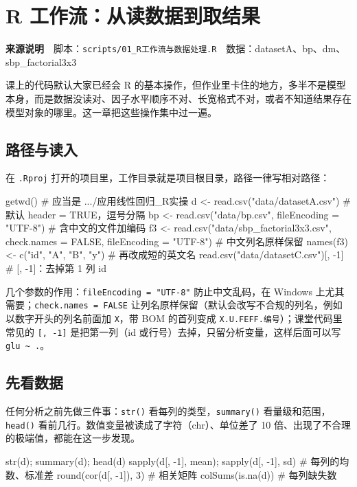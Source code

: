 \chapter{R 工作流：从读数据到取结果}

\begin{studysource}
\textbf{来源说明}　脚本：\texttt{scripts/01\_R工作流与数据处理.R}　数据：datasetA、bp、dm、sbp\_factorial3x3
\end{studysource}


课上的代码默认大家已经会 R 的基本操作，但作业里卡住的地方，多半不是模型本身，而是数据没读对、因子水平顺序不对、长宽格式不对，或者不知道结果存在模型对象的哪里。这一章把这些操作集中过一遍。

\section{路径与读入}
在 \Verb|.Rproj| 打开的项目里，工作目录就是项目根目录，路径一律写相对路径：

\begin{rcode}[R · 读入数据]
getwd()                                   # 应当是 .../应用线性回归_R实操
d  <- read.csv("data/datasetA.csv")       # 默认 header = TRUE，逗号分隔
bp <- read.csv("data/bp.csv", fileEncoding = "UTF-8")   # 含中文的文件加编码
f3 <- read.csv("data/sbp_factorial3x3.csv", check.names = FALSE,
               fileEncoding = "UTF-8")    # 中文列名原样保留
names(f3) <- c("id", "A", "B", "y")       # 再改成短的英文名
read.csv("data/datasetC.csv")[, -1]       # [, -1]：去掉第 1 列 id
\end{rcode}

几个参数的作用：\Verb|fileEncoding = "UTF-8"| 防止中文乱码，在 Windows 上尤其需要；\Verb|check.names = FALSE| 让列名原样保留（默认会改写不合规的列名，例如以数字开头的列名前面加 \Verb|X|，带 BOM 的首列变成 \Verb|X.U.FEFF.编号|）；课堂代码里常见的 \Verb|[, -1]| 是把第一列（id 或行号）去掉，只留分析变量，这样后面可以写 \Verb|glu ~ .|。

\section{先看数据}
任何分析之前先做三件事：\Verb|str()| 看每列的类型，\Verb|summary()| 看量级和范围，\Verb|head()| 看前几行。数值变量被读成了字符（chr）、单位差了 10 倍、出现了不合理的极端值，都能在这一步发现。

\begin{rcode}[R · 第一眼]
str(d); summary(d); head(d)
sapply(d[, -1], mean); sapply(d[, -1], sd)   # 每列的均数、标准差
round(cor(d[, -1]), 3)                        # 相关矩阵
colSums(is.na(d))                             # 每列缺失数
\end{rcode}

